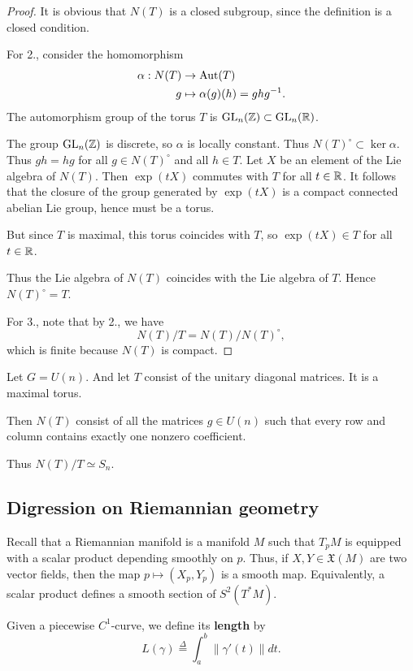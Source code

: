 \documentclass[11pt, english]{article}
\begin{document}
\begin{proof}
It is obvious that $N(T)$ is a closed subgroup, since the definition is a closed condition.

For 2., consider the homomorphism
\begin{align*}
  \alpha:N(T) &\to \operatorname{Aut}(T) \\
g &\mapsto \alpha(g)(h)=ghg^{-1}.
\end{align*}
The automorphism group of the torus $T$ is $\operatorname{GL}_n(\mathbb{Z}) \subset \operatorname{GL}_n(\mathbb{R})$.

The group $\operatorname{GL}_n(\mathbb{Z})$ is discrete, so $\alpha$ is locally constant. Thus $N(T)^\circ \subset \ker \alpha$. Thus $gh=hg$ for all $g \in N(T)^\circ$ and all $h \in T$. Let $X$ be an element of the Lie algebra of $N(T)$. Then $\exp(tX)$ commutes with $T$ for all $t \in \mathbb{R}$. It follows that the closure of the group generated by $\exp(tX)$ is a compact connected abelian Lie group, hence must be a torus. 

But since $T$ is maximal, this torus coincides with $T$, so $\exp(tX) \in T$ for all $t \in \mathbb{R}$. 

Thus the Lie algebra of $N(T)$ coincides with the Lie algebra of $T$. Hence $N(T)^\circ =T$.

For 3., note that by 2., we have
$$
N(T)/T = N(T) /N(T)^\circ ,
$$
which is finite because $N(T)$ is compact.
\end{proof}

\begin{example}
Let $G=U(n)$. And let $T$ consist of the unitary diagonal matrices. It is a maximal torus. 

Then $N(T)$ consist of all the matrices $g \in U(n)$ such that every row and column contains exactly one nonzero coefficient. 

Thus $N(T)/T \simeq S_n$. 
\end{example}

\subsection{Digression on Riemannian geometry}

Recall that a Riemannian manifold is a manifold $M$ such that $T_pM$ is equipped with a scalar product depending smoothly on $p$. Thus, if $X,Y \in \mathfrak X(M)$ are two vector fields, then the map $p \mapsto (X_p,Y_p)$ is a smooth map. Equivalently, a scalar product defines a smooth section of $S^2(T^\ast M)$.

Given a piecewise $C^1$-curve, we define its \textbf{length} by 
$$
L(\gamma) \stackrel{\Delta}{=} \int_a^b \| \gamma'(t) \| dt.
$$
\end{document}
